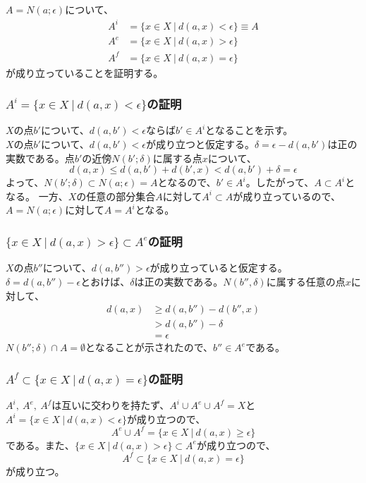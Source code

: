 \documentclass{jsarticle}
\begin{document}
\subsection{}
$A=N(a;\epsilon)$について、
\begin{align*}
A^i&=\{x\in X\ |\ d(a,x)<\epsilon\}\equiv A\\
A^e&=\{x\in X\ |\ d(a,x)>\epsilon\}\\
A^f&=\{x\in X\ |\ d(a,x)=\epsilon\}
\end{align*}
が成り立っていることを証明する。
\subsubsection{$A^i=\{x\in X\ |\ d(a,x)<\epsilon\}$の証明}
$X$の点$b'$について、$d(a,b')<\epsilon$ならば$b'\in A^i$となることを示す。\\
$X$の点$b'$について、$d(a,b')<\epsilon$が成り立つと仮定する。$\delta=\epsilon-d(a,b')$は正の実数である。点$b'$の近傍$N(b';\delta)$に属する点$x$について、
\[d(a,x)\leq d(a,b')+d(b',x)<d(a,b')+\delta=\epsilon\]
よって、$N(b';\delta)\subset N(a;\epsilon)=A$となるので、$b'\in A^i$。したがって、$A\subset A^i$となる。
一方、$X$の任意の部分集合$A$に対して$A^i\subset A$が成り立っているので、$A=N(a;\epsilon)$に対して$A=A^i$となる。

\subsubsection{$\{x\in X\ |\ d(a,x)>\epsilon\}\subset A^e$の証明}
$X$の点$b''$について、$d(a,b'')>\epsilon$が成り立っていると仮定する。$\delta=d(a,b'')-\epsilon$とおけば、$\delta$は正の実数である。$N(b'',\delta)$に属する任意の点$x$に対して、
\begin{align*}
d(a,x)&\geq d(a,b'')-d(b'',x)\\
&> d(a,b'')-\delta\\
&=\epsilon
\end{align*}
$N(b'';\delta)\cap A=\emptyset$となることが示されたので、$b''\in A^e$である。

\subsubsection{$A^f\subset\{x\in X\ |\ d(a,x)=\epsilon\}$の証明}
$A^i,\ A^e,\ A^f$は互いに交わりを持たず、$A^i\cup A^e\cup A^f=X$と$A^i=\{x\in X\ |\ d(a,x)<\epsilon\}$が成り立つので、
\[A^e\cup A^f=\{x\in X\ |\ d(a,x)\geq\epsilon\}\]
である。また、$\{x\in X\ |\ d(a,x)>\epsilon\}\subset A^e$が成り立つので、
\[A^f\subset\{x\in X\ |\ d(a,x)=\epsilon\}\]
が成り立つ。
\end{document}
